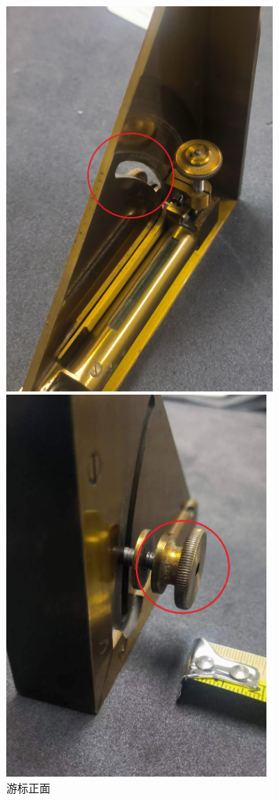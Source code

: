 \documentclass[UTF8]{ctexart}
\begin{document}
\begin{figure}[h]
    \centering
    \begin{minipage}[t]{0.3\textwidth}
        \centering
        \includegraphics[width=0.8\textwidth]{img/vernier_structure_front.jpg}
        \caption{游标正面}
        \label{fig:vernier_structure_front}
    \end{minipage}
    \begin{minipage}[t]{0.3\textwidth}
        \centering
        \includegraphics[width=0.78\textwidth]{img/vernier_structure_back.jpg}

\end{minipage}
\end{figure}
\end{document}

